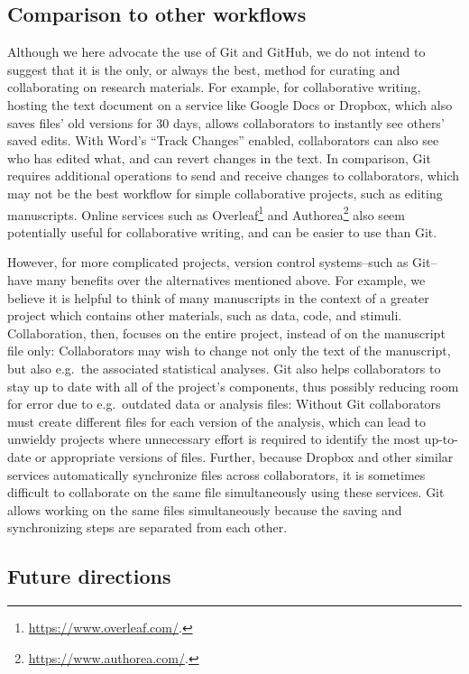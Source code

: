 \documentclass[
  american,
  ,doc,floatsintext]{apa6}
\begin{document}
\hypertarget{comparison-to-other-workflows}{%
\subsection{Comparison to other workflows}\label{comparison-to-other-workflows}}

Although we here advocate the use of Git and GitHub, we do not intend to suggest that it is the only, or always the best, method for curating and collaborating on research materials. For example, for collaborative writing, hosting the text document on a service like Google Docs or Dropbox, which also saves files' old versions for 30 days, allows collaborators to instantly see others' saved edits. With Word's \enquote{Track Changes} enabled, collaborators can also see who has edited what, and can revert changes in the text. In comparison, Git requires additional operations to send and receive changes to collaborators, which may not be the best workflow for simple collaborative projects, such as editing manuscripts. Online services such as Overleaf\footnote{\url{https://www.overleaf.com/}.} and Authorea\footnote{\url{https://www.authorea.com/}.} also seem potentially useful for collaborative writing, and can be easier to use than Git.

However, for more complicated projects, version control systems--such as Git--have many benefits over the alternatives mentioned above. For example, we believe it is helpful to think of many manuscripts in the context of a greater project which contains other materials, such as data, code, and stimuli. Collaboration, then, focuses on the entire project, instead of on the manuscript file only: Collaborators may wish to change not only the text of the manuscript, but also e.g.~the associated statistical analyses. Git also helps collaborators to stay up to date with all of the project's components, thus possibly reducing room for error due to e.g.~outdated data or analysis files: Without Git collaborators must create different files for each version of the analysis, which can lead to unwieldy projects where unnecessary effort is required to identify the most up-to-date or appropriate versions of files. Further, because Dropbox and other similar services automatically synchronize files across collaborators, it is sometimes difficult to collaborate on the same file simultaneously using these services. Git allows working on the same files simultaneously because the saving and synchronizing steps are separated from each other.

\hypertarget{future-directions}{%
\subsection{Future directions}\label{future-directions}}
\end{document}
